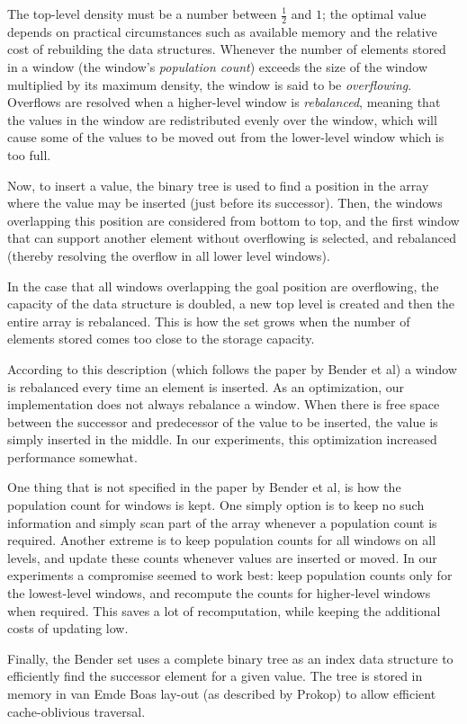 \documentclass{acm_proc_article-sp}
\begin{document}
The top-level density must be a number between $\frac{1}{2}$ and $1$; the optimal value
depends on practical circumstances such as available memory and the relative cost of
rebuilding the data structures. Whenever the number of elements stored in
a window (the window's \emph{population count}) exceeds the size of the window
multiplied by its maximum density, the window is said to be \emph{overflowing}.
Overflows are resolved when a higher-level window is \emph{rebalanced},
meaning that the values in the window are redistributed evenly over the window,
which will cause some of the values to be moved out from the lower-level window
which is too full.

Now, to insert a value, the binary tree is used to find a position in the array
where the value may be inserted (just before its successor). Then, the windows
overlapping this position are considered from bottom to top, and the first
window that can support another element without overflowing is selected, and
rebalanced (thereby resolving the overflow in all lower level windows).

In the case that all windows overlapping the goal position are overflowing, the
capacity of the data structure is doubled, a new top level is created and then
the entire array is rebalanced. This is how the set grows when the number of
elements stored comes too close to the storage capacity.

According to this description (which follows the paper by Bender et al) a window
is rebalanced every time an element is inserted. As an optimization, our
implementation does not always rebalance a window. When there is free space
between the successor and predecessor of the value to be inserted, the value
is simply inserted in the middle. In our experiments, this optimization
increased performance somewhat.

One thing that is not specified in the paper by Bender et al, is how the
population count for windows is kept. One simply option is to keep no such
information and simply scan part of the array whenever a population count is
required. Another extreme is to keep population counts for all windows on all
levels, and update these counts whenever values are inserted or moved. In
our experiments a compromise seemed to work best: keep population counts only
for the lowest-level windows, and recompute the counts for higher-level windows
when required. This saves a lot of recomputation, while keeping the additional
costs of updating low.

Finally, the Bender set uses a complete binary tree as an index data structure
to efficiently find the successor element for a given value. The tree is
stored in memory in van Emde Boas lay-out (as described by Prokop) to allow
efficient cache-oblivious traversal.
\end{document}
